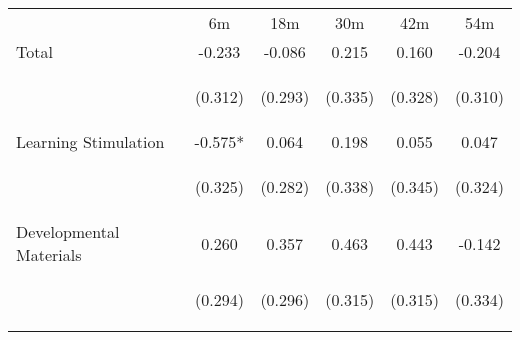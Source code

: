 \begin{tabular}{lccccc}
\hline \noalign{\smallskip} & 6m & 18m & 30m & 42m & 54m\\
\noalign{\smallskip}\hline \noalign{\smallskip}Total & -0.233 & -0.086 & 0.215 & 0.160 & -0.204\\
 & \begin{footnotesize}(0.312)\end{footnotesize} & \begin{footnotesize}(0.293)\end{footnotesize} & \begin{footnotesize}(0.335)\end{footnotesize} & \begin{footnotesize}(0.328)\end{footnotesize} & \begin{footnotesize}(0.310)\end{footnotesize}\\
\noalign{\smallskip}Learning Stimulation & -0.575* & 0.064 & 0.198 & 0.055 & 0.047\\
 & \begin{footnotesize}(0.325)\end{footnotesize} & \begin{footnotesize}(0.282)\end{footnotesize} & \begin{footnotesize}(0.338)\end{footnotesize} & \begin{footnotesize}(0.345)\end{footnotesize} & \begin{footnotesize}(0.324)\end{footnotesize}\\
\noalign{\smallskip}Developmental Materials & 0.260 & 0.357 & 0.463 & 0.443 & -0.142\\
 & \begin{footnotesize}(0.294)\end{footnotesize} & \begin{footnotesize}(0.296)\end{footnotesize} & \begin{footnotesize}(0.315)\end{footnotesize} & \begin{footnotesize}(0.315)\end{footnotesize} & \begin{footnotesize}(0.334)\end{footnotesize}\\

\end{tabular}
